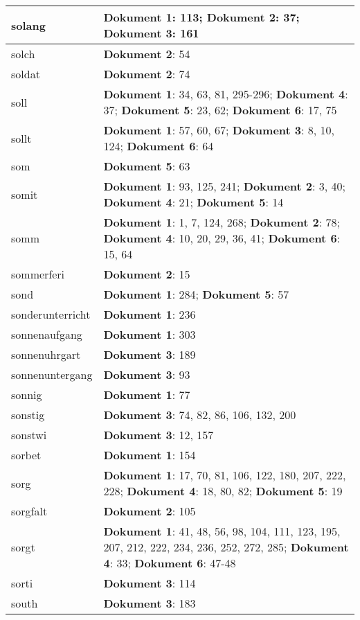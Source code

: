 \documentclass[a5paper]{article}
\begin{document}
\begin{longtable}[l]{|l|p{3in}|}
\hline
solang & \textbf{Dokument 1}: 113; \textbf{Dokument 2}: 37; \textbf{Dokument 3}: 161 \\
\hline
solch & \textbf{Dokument 2}: 54 \\
\hline
soldat & \textbf{Dokument 2}: 74 \\
\hline
soll & \textbf{Dokument 1}: 34, 63, 81, 295-296; \textbf{Dokument 4}: 37; \textbf{Dokument 5}: 23, 62; \textbf{Dokument 6}: 17, 75 \\
\hline
sollt & \textbf{Dokument 1}: 57, 60, 67; \textbf{Dokument 3}: 8, 10, 124; \textbf{Dokument 6}: 64 \\
\hline
som & \textbf{Dokument 5}: 63 \\
\hline
somit & \textbf{Dokument 1}: 93, 125, 241; \textbf{Dokument 2}: 3, 40; \textbf{Dokument 4}: 21; \textbf{Dokument 5}: 14 \\
\hline
somm & \textbf{Dokument 1}: 1, 7, 124, 268; \textbf{Dokument 2}: 78; \textbf{Dokument 4}: 10, 20, 29, 36, 41; \textbf{Dokument 6}: 15, 64 \\
\hline
sommerferi & \textbf{Dokument 2}: 15 \\
\hline
sond & \textbf{Dokument 1}: 284; \textbf{Dokument 5}: 57 \\
\hline
sonderunterricht & \textbf{Dokument 1}: 236 \\
\hline
sonnenaufgang & \textbf{Dokument 1}: 303 \\
\hline
sonnenuhrgart & \textbf{Dokument 3}: 189 \\
\hline
sonnenuntergang & \textbf{Dokument 3}: 93 \\
\hline
sonnig & \textbf{Dokument 1}: 77 \\
\hline
sonstig & \textbf{Dokument 3}: 74, 82, 86, 106, 132, 200 \\
\hline
sonstwi & \textbf{Dokument 3}: 12, 157 \\
\hline
sorbet & \textbf{Dokument 1}: 154 \\
\hline
sorg & \textbf{Dokument 1}: 17, 70, 81, 106, 122, 180, 207, 222, 228; \textbf{Dokument 4}: 18, 80, 82; \textbf{Dokument 5}: 19 \\
\hline
sorgfalt & \textbf{Dokument 2}: 105 \\
\hline
sorgt & \textbf{Dokument 1}: 41, 48, 56, 98, 104, 111, 123, 195, 207, 212, 222, 234, 236, 252, 272, 285; \textbf{Dokument 4}: 33; \textbf{Dokument 6}: 47-48 \\
\hline
sorti & \textbf{Dokument 3}: 114 \\
\hline
south & \textbf{Dokument 3}: 183 \\

\end{longtable}
\end{document}
